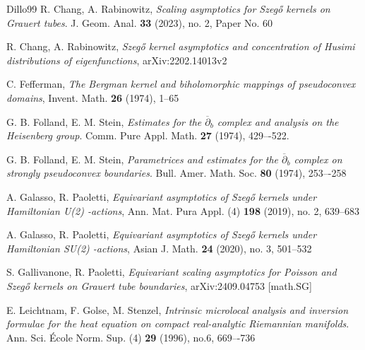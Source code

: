\documentclass[12pt,a4paper]{article}
\theoremstyle{plain}
\theoremstyle{definition}
\begin{document}
\begin{thebibliography}{Dillo99}
 R. Chang, A. Rabinowitz, {\em 
Scaling asymptotics for Szeg\H{o} kernels on Grauert tubes}. 
J. Geom. Anal. \textbf{33} (2023), no. 2, Paper No. 60

R. Chang, A. Rabinowitz, {\em 
Szeg\H{o} kernel asymptotics and concentration of Husimi distributions of eigenfunctions},
arXiv:2202.14013v2



C. Fefferman, {\em The Bergman kernel and biholomorphic mappings of pseudoconvex domains},
Invent. Math. \textbf{26} (1974), 1–65


G. B. Folland, E. M. Stein, {\em
Estimates for the  $\overline{\partial}_b$  complex and analysis on the Heisenberg group}.
Comm. Pure Appl. Math. \textbf{27} (1974), 429–-522.

G. B. Folland, E. M. Stein, {\em
Parametrices and estimates for the  $\overline{\partial}_b$  complex on strongly pseudoconvex boundaries}.
Bull. Amer. Math. Soc. \textbf{80} (1974), 253–-258

A. Galasso, R. Paoletti, 
{\em Equivariant asymptotics of Szeg\H{o} kernels under Hamiltonian  U(2) -actions},
Ann. Mat. Pura Appl. (4) 
\textbf{198}  (2019), no. 2, 639–683

A. Galasso, R. Paoletti, 
{\em 
Equivariant asymptotics of Szeg\H{o} kernels under Hamiltonian  SU(2) -actions},
Asian J. Math. \textbf{24} (2020), no. 3, 501–532

S. Gallivanone, R. Paoletti,
{\em  Equivariant scaling asymptotics for Poisson and Szeg\H{o} kernels on Grauert tube boundaries},
arXiv:2409.04753 [math.SG]

E. Leichtnam, F. Golse, M. Stenzel, {\em
Intrinsic microlocal analysis and inversion formulae for the heat equation on compact real-analytic Riemannian manifolds}.
Ann. Sci. \'{E}cole Norm. Sup. (4) \textbf{29} (1996), no.6, 669–-736


\end{thebibliography}
\end{document}
